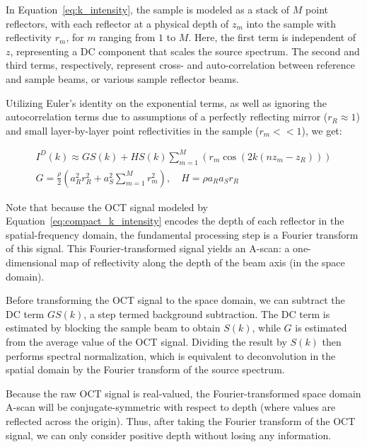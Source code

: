 \documentclass[10pt]{article}
\begin{document}
In Equation~\ref{eq:k_intensity}, the sample is modeled as a stack of $M$ point reflectors, with each reflector at a physical depth of $z_m$ into the sample with reflectivity $r_m$, for $m$ ranging from $1$ to $M$. Here, the first term is independent of $z$, representing a DC component that scales the source spectrum. The second and third terms, respectively, represent cross- and auto-correlation between reference and sample beams, or various sample reflector beams.

Utilizing Euler's identity on the exponential terms, as well as ignoring the autocorrelation terms due to assumptions of a perfectly reflecting mirror ($r_R \approx 1$) and small layer-by-layer point reflectivities in the sample ($r_m<<1$), we get:

\begin{equation}
\begin{split}
  I^D(k) \approx GS(k) + HS(k)\sum_{m=1}^M \left( r_m \cos\left( 2k \left( nz_m-z_R\right)\right) \right) \\
  G = \frac{\rho}{2}\left(a_R^2r_R^2 + a_S^2 \sum_{m=1}^{M}r_m^2\right), \quad H=\rho a_R a_S r_R
\end{split}
\label{eq:compact_k_intensity}
\end{equation}

Note that because the OCT signal modeled by Equation~\ref{eq:compact_k_intensity} encodes the depth of each reflector in the spatial-frequency domain, the fundamental processing step is a Fourier transform of this signal. This Fourier-transformed signal yields an A-scan: a one-dimensional map of reflectivity along the depth of the beam axis (in the space domain).

Before transforming the OCT signal to the space domain, we can subtract the DC term $GS(k)$, a step termed background subtraction. The DC term is estimated by blocking the sample beam to obtain $S(k)$, while $G$ is estimated from the average value of the OCT signal. Dividing the result by $S(k)$ then performs spectral normalization, which is equivalent to deconvolution in the spatial domain by the Fourier transform of the source spectrum.

Because the raw OCT signal is real-valued, the Fourier-transformed space domain A-scan will be conjugate-symmetric with respect to depth (where values are reflected across the origin). Thus, after taking the Fourier transform of the OCT signal, we can only consider positive depth without losing any information.
\end{document}
